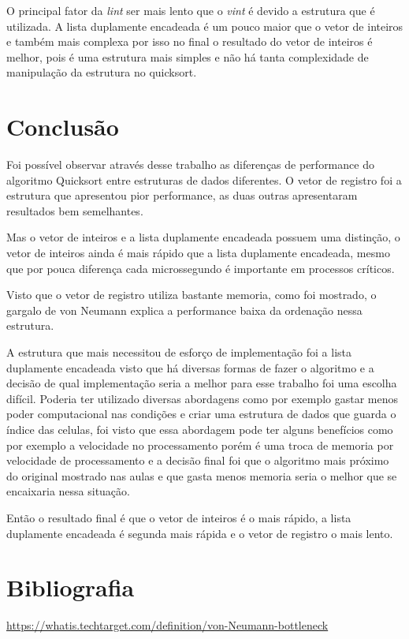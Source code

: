 \documentclass[11pt]{article}
\begin{document}
O principal fator da \emph{lint} ser mais lento que o \emph{vint} é devido a estrutura que é utilizada. A lista duplamente encadeada é um pouco maior que o vetor de inteiros e também mais complexa por isso no final o resultado do vetor de inteiros é melhor, pois é uma estrutura mais simples e não há tanta complexidade de manipulação da estrutura no quicksort.

\newpage
\section{Conclusão}
\label{sec:orgf2f1a0f}
Foi possível observar através desse trabalho as diferenças de performance do algoritmo Quicksort entre estruturas de dados diferentes. O vetor de registro foi a estrutura que apresentou pior performance, as duas outras apresentaram resultados bem semelhantes.

Mas o vetor de inteiros e a lista duplamente encadeada possuem uma distinção, o vetor de inteiros ainda é mais rápido que a lista duplamente encadeada, mesmo que por pouca diferença cada microssegundo é importante em processos críticos.

Visto que o vetor de registro utiliza bastante memoria, como foi mostrado, o gargalo de von Neumann explica a performance baixa da ordenação nessa estrutura.

A estrutura que mais necessitou de esforço de implementação foi a lista duplamente encadeada visto que há diversas formas de fazer o algoritmo e a decisão de qual implementação seria a melhor para esse trabalho foi uma escolha difícil. Poderia ter utilizado diversas abordagens como por exemplo gastar menos poder computacional nas condições e criar uma estrutura de dados que guarda o índice das celulas, foi visto que essa abordagem pode ter alguns benefícios como por exemplo a velocidade no processamento porém é uma troca de memoria por velocidade de processamento e a decisão final foi que o algoritmo mais próximo do original mostrado nas aulas e que gasta menos memoria seria o melhor que se encaixaria nessa situação.

Então o resultado final é que o vetor de inteiros é o mais rápido, a lista duplamente encadeada é segunda mais rápida e o vetor de registro o mais lento.
\section{Bibliografia}
\label{sec:org834a51e}
\url{https://whatis.techtarget.com/definition/von-Neumann-bottleneck}
\end{document}
